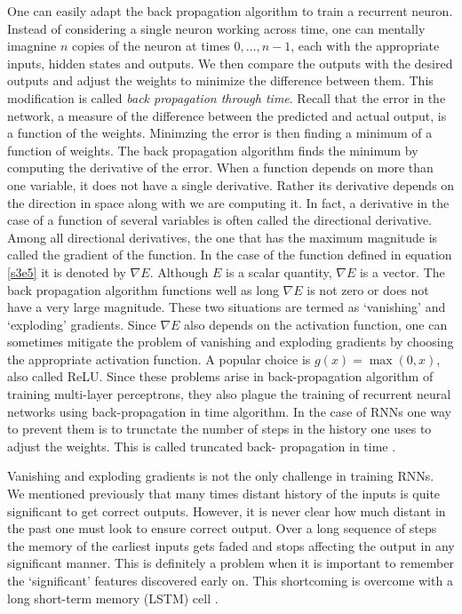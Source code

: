 \documentclass[11pt]{article}
\numberwithin{equation}{section}
\begin{document}
One can easily adapt the back propagation algorithm to train a recurrent
neuron. Instead of considering a single neuron working across time, one can
mentally imagnine $n$ copies of the neuron at times $0, \ldots, n-1$, each
with the appropriate inputs, hidden states and outputs. We then compare the
outputs with the desired outputs and adjust the weights to minimize the
difference between them. This modification is called \emph{back propagation
through time}. Recall that the error in the network, a measure of the 
difference between the predicted and actual output, is a function of the 
weights. Minimzing the error is then finding a minimum of a function of
weights. The back propagation algorithm finds the minimum by computing the
derivative of the error. When a function depends on more than one variable, it
does not have a single derivative. Rather its derivative depends on the 
direction in space along with we are computing it. In fact, a derivative in
the case of a function of several variables is often called the directional
derivative. Among all directional derivatives, the one that has the maximum
magnitude is called the gradient of the function. In the case of the function
defined in equation \eqref{s3e5} it is denoted by $\nabla E$. Although $E$
is a scalar quantity, $\nabla E$ is a vector. The back propagation algorithm 
functions well as long $\nabla E$ is not zero or does not have a very large
magnitude. These two situations are termed as `vanishing' and `exploding'
gradients. Since $\nabla E$ also depends on the activation function, one can
sometimes mitigate the problem of vanishing and exploding gradients by choosing
the appropriate activation function. A popular choice is $g(x) = \max(0, x)$,
also called ReLU. Since these problems arise in back-propagation algorithm of
training multi-layer perceptrons, they also plague the training of recurrent
neural networks using back-propagation in time algorithm. In the case of
RNNs one way to prevent them is to trunctate the number of steps in the 
history one uses to adjust the weights. This is called truncated back-
propagation in time \cite{geron2019hands}.

Vanishing and exploding gradients is not the only challenge in training RNNs. 
We mentioned previously that many times distant history of the inputs is quite
significant to get correct outputs. However, it is never clear how much distant
in the past one must look to ensure correct output. Over a long sequence of
steps the memory of the earliest inputs gets faded and stops affecting the 
output in any significant manner. This is definitely a problem when it is 
important to remember the `significant' features discovered early on. This
shortcoming is overcome with a long short-term memory (LSTM) cell 
\cite{hochreiter1997long}. 
\end{document}
